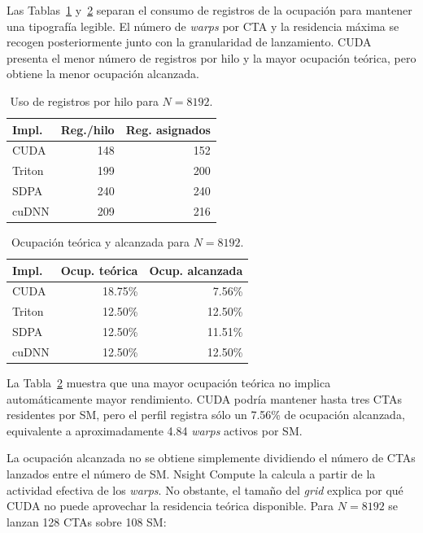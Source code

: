 Las Tablas~\ref{tab:register_usage} y~\ref{tab:occupancy_results} separan el consumo de registros de la ocupación para mantener una tipografía legible. El número de \textit{warps} por CTA y la residencia máxima se recogen posteriormente junto con la granularidad de lanzamiento. CUDA presenta el menor número de registros por hilo y la mayor ocupación teórica, pero obtiene la menor ocupación alcanzada.

\begin{table}[H]
\centering
\caption{Uso de registros por hilo para \(N=8192\).}
\label{tab:register_usage}
\begin{tabular}{lrr}
\toprule
\textbf{Impl.} & \textbf{Reg./hilo} & \textbf{Reg. asignados} \\
\midrule
CUDA   & 148 & 152 \\
Triton & 199 & 200 \\
SDPA   & 240 & 240 \\
cuDNN  & 209 & 216 \\
\bottomrule
\end{tabular}
\end{table}

\begin{table}[H]
\centering
\caption{Ocupación teórica y alcanzada para \(N=8192\).}
\label{tab:occupancy_results}
\begin{tabular}{lrr}
\toprule
\textbf{Impl.} & \textbf{Ocup. teórica} & \textbf{Ocup. alcanzada} \\
\midrule
CUDA   & 18.75\% & 7.56\% \\
Triton & 12.50\% & 12.50\% \\
SDPA   & 12.50\% & 11.51\% \\
cuDNN  & 12.50\% & 12.50\% \\
\bottomrule
\end{tabular}
\end{table}

La Tabla~\ref{tab:occupancy_results} muestra que una mayor ocupación teórica no implica automáticamente mayor rendimiento. CUDA podría mantener hasta tres CTAs residentes por SM, pero el perfil registra sólo un 7.56\% de ocupación alcanzada, equivalente a aproximadamente 4.84 \textit{warps} activos por SM.

La ocupación alcanzada no se obtiene simplemente dividiendo el número de CTAs lanzados entre el número de SM. Nsight Compute la calcula a partir de la actividad efectiva de los \textit{warps}. No obstante, el tamaño del \textit{grid} explica por qué CUDA no puede aprovechar la residencia teórica disponible. Para \(N=8192\) se lanzan 128 CTAs sobre 108 SM:


